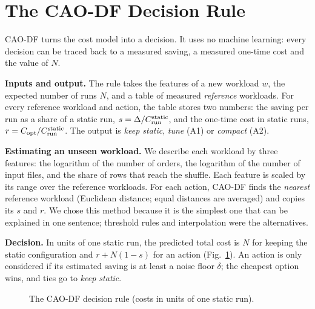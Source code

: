 \section{The CAO-DF Decision Rule}
\label{sec:framework}

CAO-DF turns the cost model into a decision. It uses no machine learning: every decision can
be traced back to a measured saving, a measured one-time cost and the value of $N$.

\textbf{Inputs and output.} The rule takes the features of a new workload $w$, the expected
number of runs $N$, and a table of measured \emph{reference} workloads. For every reference
workload and action, the table stores two numbers: the saving per run as a share of a static
run, $s = \Delta/C_{\mathrm{run}}^{\mathrm{static}}$, and the one-time cost in static runs, $r = C_{\mathrm{opt}}/C_{\mathrm{run}}^{\mathrm{static}}$. The
output is \emph{keep static}, \emph{tune} (A1) or \emph{compact} (A2).

\textbf{Estimating an unseen workload.} We describe each workload by three features: the
logarithm of the number of orders, the logarithm of the number of input files, and the share
of rows that reach the shuffle. Each feature is scaled by its range over the reference
workloads. For each action, CAO-DF finds the \emph{nearest} reference workload (Euclidean
distance; equal distances are averaged) and copies its $s$ and $r$. We chose this method
because it is the simplest one that can be explained in one sentence; threshold rules and
interpolation were the alternatives.

\textbf{Decision.} In units of one static run, the predicted total cost is $N$ for keeping the
static configuration and $r + N(1 - s)$ for an action (Fig.~\ref{fig:algo}). An action is only
considered if its estimated saving is at least a noise floor $\delta$; the cheapest option
wins, and ties go to \emph{keep static}.

\begin{figure}[t]
\centering
{}
\caption{The CAO-DF decision rule (costs in units of one static run).}
\label{fig:algo}
\end{figure}

